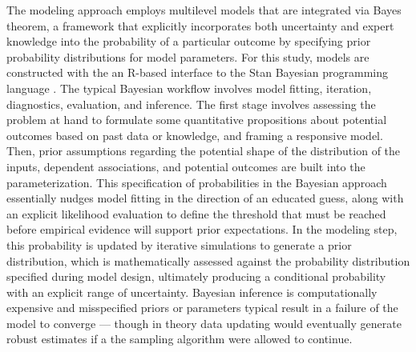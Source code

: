 The modeling approach employs multilevel models that are integrated via Bayes theorem, a framework that explicitly incorporates both uncertainty and expert knowledge into the probability of a particular outcome by specifying prior probability distributions for model parameters. For this study, models are constructed with the an R-based interface to the Stan Bayesian programming language \citep{goodrich_rstanarm_2020}. The typical Bayesian workflow involves model fitting, iteration, diagnostics, evaluation, and inference. The first stage involves assessing the problem at hand to formulate some quantitative propositions about potential outcomes based on past data or knowledge, and framing a responsive model. Then, prior assumptions regarding the potential shape of the distribution of the inputs, dependent associations, and potential outcomes are built into the parameterization. This specification of probabilities in the Bayesian approach essentially nudges model fitting in the direction of an educated guess, along with an explicit likelihood evaluation to define the threshold that must be reached before  empirical evidence will support prior expectations. In the modeling step, this probability is updated by iterative simulations to generate a prior distribution, which is mathematically assessed against the probability distribution specified during model design, ultimately producing a conditional probability with an explicit range of uncertainty. Bayesian inference is computationally expensive and misspecified priors or parameters typical result in a failure of the model to converge --- though in theory data updating would eventually generate robust estimates if a the sampling algorithm were allowed to continue.  

